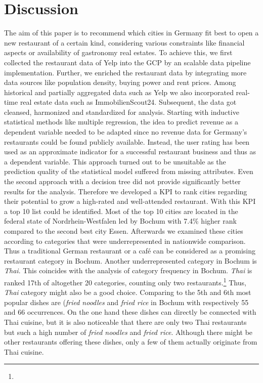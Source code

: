\section{Discussion}
\label{sec:discussion}
The aim of this paper is to recommend which cities in Germany fit best to open a new restaurant of a certain kind, considering various constraints like financial aspects or availability of gastronomy real estates. To achieve this, we first collected the restaurant data of Yelp into the \ac{GCP} by an scalable data pipeline implementation. Further, we enriched the restaurant data by integrating more data sources like population density, buying power and rent prices. 
Among historical and partially aggregated data such as Yelp we also incorporated real-time real estate data such as ImmobilienScout24. Subsequent, the data got cleansed, harmonized and standardized for analysis. \newline
Starting with inductive statistical methods like multiple regression, the idea to predict revenue as a dependent variable needed to be adapted since no revenue data for Germany's restaurants could be found publicly available. Instead, the user rating has been used as an approximate indicator for a successful restaurant business and thus as a dependent variable. This approach turned out to be unsuitable as the prediction quality of the statistical model suffered from missing attributes. Even the second approach with a decision tree did not provide significantly better results for the analysis. Therefore we developed a \ac{KPI} to rank cities regarding their potential to grow a high-rated and well-attended restaurant. With this \ac{KPI} a top 10 list could be identified. Most of the top 10 cities are located in the federal state of Nordrhein-Westfalen led by Bochum with 7.4\% higher rank compared to the second best city Essen. Afterwards we examined these cities according to categories that were underrepresented in nationwide comparison.
Thus a traditional German restaurant or a café can be considered as a promising restaurant category in Bochum. Another underrepresented category in Bochum is \textit{Thai}. 
This coincides with the analysis of category frequency in Bochum. \textit{Thai} is ranked 17th of altogether 20 categories, counting only two restaurants.\footnote{} Thus, \textit{Thai} category might also be a good choice. Comparing to  the 5th and 6th most popular dishes are (\textit{fried noodles} and \textit{fried rice} in Bochum with respectively 55 and 66 occurrences. On the one hand these dishes can directly be connected with Thai cuisine, but it is also noticeable that there are only two Thai restaurants but such a high number of \textit{fried noodles} and \textit{fried rice}. Although there might be other restaurants offering these dishes, only a few of them actually originate from Thai cuisine.

